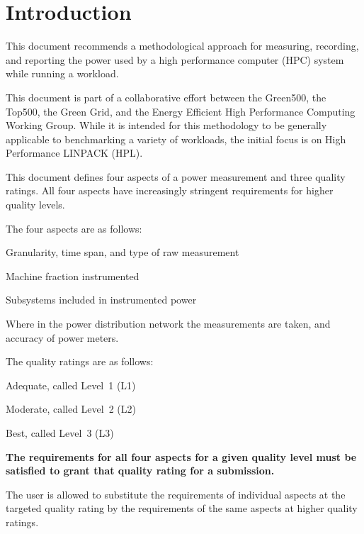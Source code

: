 \chapter{Introduction}
\label{sec:intro}

\noindent
This document recommends a methodological approach for measuring, recording, and reporting the power used by a high performance 
computer (HPC) system while
running a workload. 
\wl

\noindent
This document is part of a collaborative effort between the Green500, the Top500, 
the Green Grid, and the Energy Efficient High Performance Computing Working Group.  While 
it is intended for this methodology to be generally applicable to benchmarking a variety of 
workloads, the initial focus is on High Performance LINPACK (HPL). 
\wl

\noindent
This document defines four aspects of a power measurement and three quality ratings. All 
four aspects have increasingly stringent requirements for higher quality levels.  
\wl

\noindent
The four aspects are as follows:

\begin{packed_enum}
\item 
Granularity, time span, and type of raw measurement
\item 
Machine fraction instrumented
\item 
Subsystems included in instrumented power
\item 
Where in the power distribution network the measurements are taken, and accuracy of power meters.
\end{packed_enum}

\noindent
The quality ratings are as follows:

\begin{packed_item}
\item 
Adequate, called Level~1 (L1)
\item
Moderate, called Level~2 (L2)
\item
Best, called Level~3 (L3)
\end{packed_item}

\noindent
\textbf{The requirements for all four aspects for a given quality level must be satisfied to grant that quality rating for a submission.}
\wl

\noindent
The user is allowed to substitute the requirements of individual aspects at the targeted quality rating by the requirements of the same aspects at higher quality ratings.
\wl
